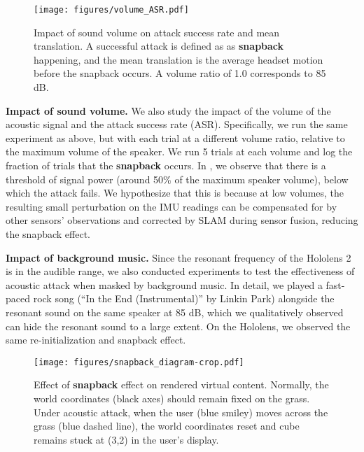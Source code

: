 \begin{figure}[h]
    \centering
    \texttt{[image: figures/volume\_ASR.pdf]}
    \caption{Impact of sound volume on attack success rate and mean translation.
   A successful attack is defined as as \textbf{snapback} happening, and the mean translation is the average headset motion before the snapback occurs.
   A volume ratio of 1.0 corresponds to 85 dB.}
    \label{fig:volume_ASR}
\end{figure}

\textbf{Impact of sound volume.}
We also study the impact of the volume of the acoustic signal and the attack success rate (ASR).
Specifically, we run the same experiment as above, but with each trial at a different volume ratio, relative to the maximum volume of the speaker.
We run 5 trials at each volume and log the fraction of trials that the \textbf{snapback} occurs. In , we observe that there is a threshold of signal power (around 50\% of the maximum speaker volume), below which the attack fails. %
We hypothesize that this is because at low volumes, the resulting small perturbation on the IMU readings can be compensated for by other sensors' observations and corrected by SLAM during sensor fusion, reducing the snapback effect. 

\textbf{Impact of background music.}
Since the resonant frequency of the Hololens 2 is in the audible range, we also conducted experiments to test the effectiveness of %
acoustic attack when masked by background music. 
In detail, we played a fast-paced rock song (``In the End (Instrumental)'' by Linkin Park) alongside the resonant sound on the same speaker at 85 dB, %
which we qualitatively observed can hide the resonant sound to a large extent.
On the Hololens, we observed the same re-initialization and snapback effect.





\begin{figure}
    \centering
    \texttt{[image: figures/snapback\_diagram-crop.pdf]}
    \caption{Effect of \textbf{snapback} effect on rendered virtual content. Normally, the world coordinates (black axes) should remain fixed on the grass. Under acoustic attack, when the user (blue smiley) moves across the grass (blue dashed line), the world coordinates reset and cube remains stuck at (3,2) in the user's display.
    }
    \label{fig:snapback_virtual}
\end{figure}



